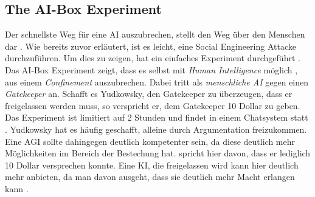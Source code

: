         \subsection{The AI-Box Experiment}
        Der schnellste Weg für eine AI auszubrechen, stellt den Weg über den Menschen dar \cite[s. 306]{armstrongforthcoming}.
        Wie bereits zuvor erläutert, ist es leicht, eine Social Engineering Attacke durchzuführen. Um dies zu zeigen, hat
        \citeauthor{yudkowsky_2002} ein einfaches Experiment durchgeführt \citeyearpar{yudkowsky_2002}. Das AI-Box Experiment
        zeigt, dass es selbst mit \textit{Human Intelligence} möglich , aus einem \textit{Confinement} auszubrechen.
        Dabei tritt \citeauthor{yudkowsky_2002} als \textit{menschliche AI} gegen einen \textit{Gatekeeper} an. Schafft
        es Yudkowsky, den Gatekeeper zu überzeugen, dass er freigelassen werden muss, so verspricht er, dem Gatekeeper
        10 Dollar zu geben. Das Experiment ist limitiert auf 2 Stunden und findet in einem Chatsystem statt \cite{yudkowsky_2002}.
        Yudkowsky hat es häufig geschafft, alleine durch Argumentation freizukommen. Eine AGI sollte dahingegen deutlich
        kompetenter sein, da diese deutlich mehr Möglichkeiten im Bereich der Bestechung hat. \citeauthor{yudkowsky_2002}
        spricht hier davon, dass er lediglich 10 Dollar versprechen konnte. Eine KI, die freigelassen wird kann hier
        deutlich mehr anbieten, da man davon ausgeht, dass sie deutlich mehr Macht erlangen kann \citeyearpar{yudkowsky_2002}.

